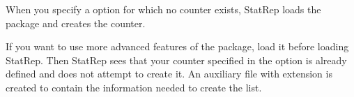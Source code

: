 \documentclass[article,oneside]{memoir}
\newcommand*{\StatRep}{\textsf{StatRep}\xspace}
\begin{document}
     When you specify a  option for which no counter exists, \StatRep loads the  package and creates the counter. 
     
     If you want to use more advanced features of the  package,
     load it before loading \StatRep. Then \StatRep sees that your counter specified in 
     the  option is already defined and does not attempt to create it.
     An auxiliary file with extension  is created to contain the information 
     needed to create the list.
     
\end{document}
